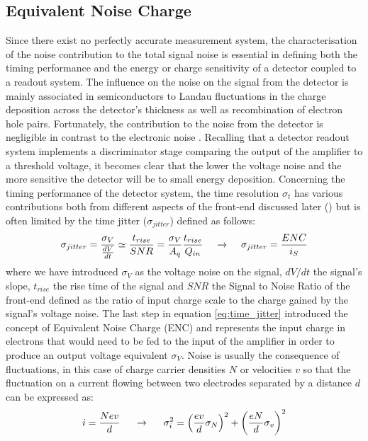 		\subsection{Equivalent Noise Charge}\label{subsec:2.3.3}
		Since there exist no perfectly accurate measurement system, the characterisation of the noise contribution to the total signal noise is essential in defining both the timing performance and the energy or charge sensitivity of a detector coupled to a readout system. The influence on the noise on the signal from the detector is mainly associated in semiconductors to Landau fluctuations in the charge deposition across the detector's thickness as well as recombination of electron hole pairs. Fortunately, the contribution to the noise from the detector is negligible in contrast to the electronic noise \cite{detectors}. Recalling that a detector readout system implements a discriminator stage comparing the output of the amplifier to a threshold voltage, it becomes clear that the lower the voltage noise and the more sensitive the detector will be to small energy deposition. Concerning the timing performance of the detector system, the time resolution $\sigma_t$ has various contributions both from different aspects of the front-end discussed later () but is often limited by the time jitter ($\sigma_{jitter}$) defined as follows: 
		\begin{equation}
			\sigma_{jitter} = \frac{\sigma_V}{\frac{dV}{dt}}\simeq  \frac{t_{rise}}{SNR} = \frac{\sigma_V}{A_q} \frac{t_{rise}}{Q_{in}} \hspace{4mm} \rightarrow \hspace{4mm} \sigma_{jitter} = \frac{ENC}{i_{S}}
			\label{eq:time_jitter}
		\end{equation}
		where we have introduced $\sigma_V$ as the voltage noise on the signal, $dV/dt$ the signal's slope, $t_{rise}$ the rise time of the signal and $SNR$ the Signal to Noise Ratio of the front-end defined as the ratio of input charge scale to the charge gained by the signal's voltage noise. The last step in equation \eqref{eq:time_jitter} introduced the concept of Equivalent Noise Charge (ENC) and represents the input charge in electrons that would need to be fed to the input of the amplifier in order to produce an output voltage equivalent $\sigma_V$. Noise is usually the consequence of fluctuations, in this case of charge carrier densities $N$ or velocities $v$ so that the fluctuation on a current flowing between two electrodes separated by a distance $d$ can be expressed as: 
		\begin{equation}
			i = \frac{Nev}{d} \hspace{5mm} \rightarrow \hspace{5mm} \sigma_i^2 = {\left( \frac{ev}{d} \sigma_N \right)}^2 + {\left( \frac{eN}{d} \sigma_v \right)}^2
		\end{equation}
